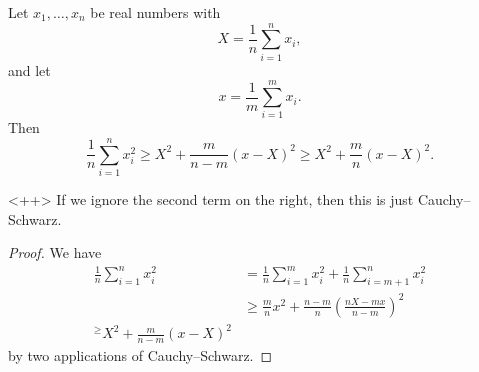 \documentclass[a4paper]{article}
\begin{document}
\begin{lemma}
  Let $x_1, \ldots, x_n$ be real numbers with
  \[
    X = \frac{1}{n} \sum_{i = 1}^n x_i,
  \]
  and let
  \[
    x = \frac{1}{m} \sum_{i = 1}^m x_i.
  \]
  Then
  \[
    \frac{1}{n} \sum_{i = 1}^n x_i^2 \geq X^2 + \frac{m}{n - m}(x - X)^2 \geq X^2 + \frac{m}{n} (x - X)^2.
  \]
\end{lemma}<++>
If we ignore the second term on the right, then this is just Cauchy--Schwarz.

\begin{proof}
  We have
  \begin{align*}
    \frac{1}{n} \sum_{i = 1}^n x_i^2 &= \frac{1}{n} \sum_{i = 1}^m x_i^2 + \frac{1}{n} \sum_{i = m + 1}^n x_i^2 \\
    &\geq \frac{m}{n} x^2 + \frac{n - m}{n} \left(\frac{nX - mx}{n - m}\right)^2\\
    ^\geq X^2 + \frac{m}{n - m} (x - X)^2
  \end{align*}
  by two applications of Cauchy--Schwarz.
\end{proof}
\end{document}
